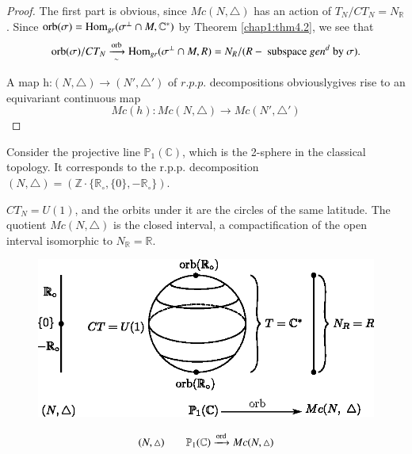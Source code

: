 \begin{proof}
The  first part is obvious, since $Mc(N,\triangle)$ has an action of\break
$T_N/CT_N=N_{\mathbb{R}}$. Since $\operatorname{orb}(\sigma)=\operatorname{Hom}_{gr}(\sigma^\perp \cap
M,\mathbb{C}^*)$ by Theorem \ref{chap1:thm4.2}, we see that 
$$
\operatorname{orb}(\sigma)/CT_N\xrightarrow[\sim]{\operatorname{orb}}\operatorname{Hom}_{gr}(\sigma^\perp\cap
M,R)=N_R/(R-\text{ subspace $gen^d$ by }\sigma). 
$$

A map h:$(N,\triangle)\to (N',\triangle')$ of $r.p.p$. decompositions
obviously\pageoriginale gives rise to an equivariant continuous map
$$
Mc(h) : Mc (N, \triangle ) \to Mc (N', \triangle')
$$
\end{proof}

\begin{example*}[(Mumford)]
 Consider the projective line $\mathbb{P}_1 (\mathbb{C})$, which is the
 2-sphere in the classical topology. It corresponds to the
 r.p.p. decomposition $(N, \triangle) =
 (\mathbb{Z} \cdot \{\mathbb{R}_\circ, \{0\}, -\mathbb{R}_\circ\})$. 

$CT_N = U(1)$, and the orbits under it are the circles of the same
latitude. The quotient $Mc(N, \triangle)$ is the closed interval, a
compactification of the open interval isomorphic to
$N_{\mathbb{R}}=\mathbb{R}$. 
\begin{figure}[H]
\centering 
\includegraphics{vol58-fig/fig58-58.eps} 
\end{figure}
$$
(N, \triangle) \qquad \mathbb{P}_1 (\mathbb{C}) \xrightarrow{\operatorname{ord}} Mc
(N, \triangle)  
$$
\end{example*}

